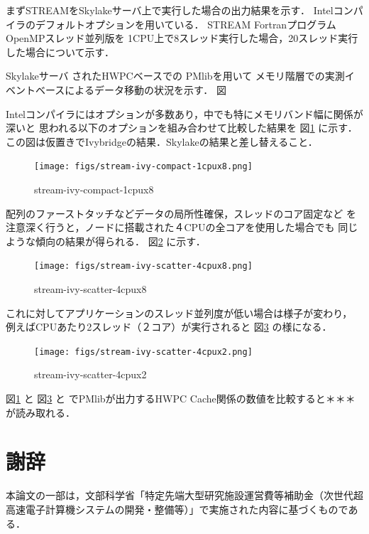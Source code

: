 \documentclass[submit,techrep,noauthor]{ipsj}
\begin{document}
まずSTREAMをSkylakeサーバ上で実行した場合の出力結果を示す．
Intelコンパイラのデフォルトオプションを用いている．
STREAM FortranプログラムOpenMPスレッド並列版を
1CPU上で8スレッド実行した場合，20スレッド実行した場合について示す．


Skylakeサーバ
されたHWPCベースでの
PMlibを用いて
メモリ階層での実測イベントベースによるデータ移動の状況を示す．
図



Intelコンパイラにはオプションが多数あり，中でも特にメモリバンド幅に関係が深いと
思われる以下のオプションを組み合わせて比較した結果を
図\ref{fig:stream-ivy-compact-1cpux8} に示す．\\
{\color{blue}この図は仮置きでIvybridgeの結果．Skylakeの結果と差し替えること．}

\begin{figure}[bt]
\centering\texttt{[image: figs/stream-ivy-compact-1cpux8.png]}
\caption{stream-ivy-compact-1cpux8}
\label{fig:stream-ivy-compact-1cpux8}
\end{figure}


配列のファーストタッチなどデータの局所性確保，スレッドのコア固定など
を注意深く行うと，ノードに搭載された４CPUの全コアを使用した場合でも
同じような傾向の結果が得られる．
図\ref{fig:stream-ivy-scatter-4cpux8} に示す．\\

\begin{figure}[bt]
\centering\texttt{[image: figs/stream-ivy-scatter-4cpux8.png]}
\caption{stream-ivy-scatter-4cpux8}
\label{fig:stream-ivy-scatter-4cpux8}
\end{figure}

これに対してアプリケーションのスレッド並列度が低い場合は様子が変わり，
例えばCPUあたり2スレッド（２コア）が実行されると
図\ref{fig:stream-ivy-scatter-4cpux2} の様になる．\\

\begin{figure}[bt]
\centering\texttt{[image: figs/stream-ivy-scatter-4cpux2.png]}
\caption{stream-ivy-scatter-4cpux2}
\label{fig:stream-ivy-scatter-4cpux2}
\end{figure}

図\ref{fig:stream-ivy-compact-1cpux8} と
図\ref{fig:stream-ivy-scatter-4cpux2} と
でPMlibが出力するHWPC Cache関係の数値を比較すると＊＊＊
が読み取れる．
\fi


\section{謝辞}
本論文の一部は，文部科学省「特定先端大型研究施設運営費等補助金（次世代超高速電子計算機システムの開発・整備等）」で実施された内容に基づくものである．




%
\end{document}
